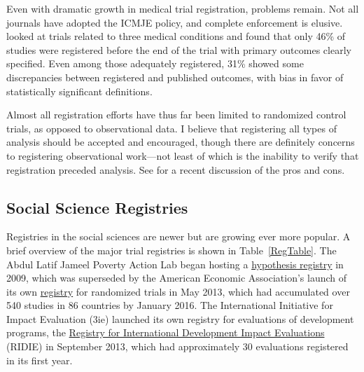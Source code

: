 \documentclass[12pt] {article}
\begin{document}
Even with dramatic growth in medical trial registration, problems
remain. Not all journals have adopted the ICMJE policy, and complete
enforcement is elusive. \cite{mathieu_s_comparison_2009} looked at trials related
to three medical conditions and found that only 46\% of studies were
registered before the end of the trial with primary outcomes clearly
specified. Even among those adequately registered, 31\% showed some
discrepancies between registered and published outcomes, with bias in
favor of statistically significant definitions.

Almost all registration efforts have thus far been limited to randomized
control trials, as opposed to observational data. I believe
that registering all types of analysis should be accepted and encouraged, though there are definitely concerns to registering observational work---not least of which is the inability to verify that registration preceded analysis. See \cite{dal-re_making_2014} for a recent discussion of the pros and cons.
 
\subsection{Social Science Registries}\label{social-science-registries}

Registries in the social sciences are newer but are growing ever more
popular. A brief overview of the major trial registries is shown in Table~\ref{RegTable}. The Abdul Latif Jameel Poverty Action Lab began hosting a
\href{http://www.povertyactionlab.org/hypothesis-registry}{hypothesis registry}
 in 2009, which was superseded by the American Economic Association's launch of its own \href{http://socialscienceregistry.org}{registry} for randomized trials in May 2013, which had accumulated over 540 studies in 86 countries by
January 2016. The International Initiative for Impact Evaluation (3ie)
launched its own registry for evaluations of development programs, the
\href{http://ridie.3ieimpact.org}{Registry for International Development Impact Evaluations} (RIDIE) in September 2013, which had
approximately 30 evaluations registered in its first year.
\end{document}
